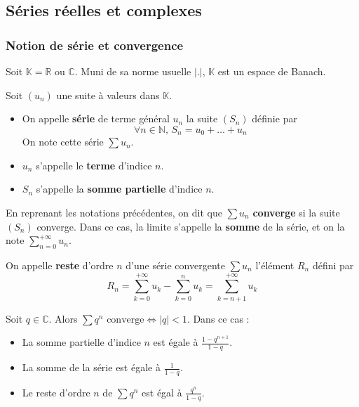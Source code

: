 



  \subsection{Séries réelles et complexes}

  \subsubsection{Notion de série et convergence}

  Soit $\mathbb{K} = \mathbb{R}$ ou $\mathbb{C}$. Muni de sa norme usuelle $\vert . \vert$, $\mathbb{K}$ est un espace de Banach.


  \begin{definition}
    Soit $(u_n)$ une suite à valeurs dans $\mathbb{K}$.
    \begin{itemize}
      \item On appelle \textbf{série} de terme général $u_n$ la suite $(S_n)$ définie par
      \[ \forall n \in \mathbb{N}, \, S_n = u_0 + \dots + u_n \]
      On note cette série $\sum u_n$.
      \item $u_n$ s'appelle le \textbf{terme} d'indice $n$.
      \item $S_n$ s'appelle la \textbf{somme partielle} d'indice $n$.
    \end{itemize}
  \end{definition}

  \begin{definition}
    En reprenant les notations précédentes, on dit que $\sum u_n$ \textbf{converge} si la suite $(S_n)$ converge. Dans ce cas, la limite s'appelle la \textbf{somme} de la série, et on la note $\sum_{n=0}^{+\infty} u_n$.
  \end{definition}

  \begin{definition}
    On appelle \textbf{reste} d'ordre $n$ d'une série convergente $\sum u_n$ l'élément $R_n$ défini par
    \[ R_n = \sum_{k=0}^{+\infty} u_k - \sum_{k=0}^{n} u_k = \sum_{k=n+1}^{+\infty} u_k \]
  \end{definition}

  \begin{example}
    Soit $q \in \mathbb{C}$. Alors $\sum q^n \text{ converge} \iff |q| < 1$. Dans ce cas :
    \begin{itemize}
      \item La somme partielle d'indice $n$ est égale à $\frac{1-q^{n+1}}{1-q}$.
      \item La somme de la série est égale à $\frac{1}{1-q}$.
      \item Le reste d'ordre $n$ de $\sum q^n$ est égal à $\frac{q^n}{1-q}$.
    \end{itemize}
  \end{example}

